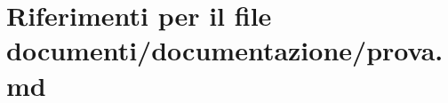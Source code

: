 \hypertarget{prova_8md}{}\section{Riferimenti per il file documenti/documentazione/prova.md}
\label{prova_8md}
